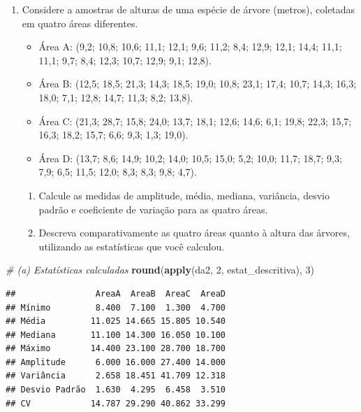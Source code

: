 \documentclass[]{article}
\newenvironment{Shaded}{\begin{snugshade}}{\end{snugshade}}
\newcommand{\KeywordTok}[1]{\textcolor[rgb]{0.13,0.29,0.53}{\textbf{#1}}}
\newcommand{\DecValTok}[1]{\textcolor[rgb]{0.00,0.00,0.81}{#1}}
\newcommand{\CommentTok}[1]{\textcolor[rgb]{0.56,0.35,0.01}{\textit{#1}}}
\newcommand{\NormalTok}[1]{#1}
\providecommand{\tightlist}{%
  \setlength{\itemsep}{0pt}\setlength{\parskip}{0pt}}
\begin{document}
\begin{enumerate}
\def\labelenumi{\arabic{enumi}.}
\setcounter{enumi}{1}
\tightlist
\item
  Considere a amostras de alturas de uma espécie de árvore (metros),
  coletadas em quatro áreas diferentes.

  \begin{itemize}
  \tightlist
  \item
    Área A: (9,2; 10,8; 10,6; 11,1; 12,1; 9,6; 11,2; 8,4; 12,9; 12,1;
    14,4; 11,1; 11,1; 9,7; 8,4; 12,3; 10,7; 12,9; 9,1; 12,8).
  \item
    Área B: (12,5; 18,5; 21,3; 14,3; 18,5; 19,0; 10,8; 23,1; 17,4; 10,7;
    14,3; 16,3; 18,0; 7,1; 12,8; 14,7; 11,3; 8,2; 13,8).
  \item
    Área C: (21,3; 28,7; 15,8; 24,0; 13,7; 18,1; 12,6; 14,6; 6,1; 19,8;
    22,3; 15,7; 16,3; 18,2; 15,7; 6,6; 9,3; 1,3; 19,0).
  \item
    Área D: (13,7; 8,6; 14,9; 10,2; 14,0; 10,5; 15,0; 5,2; 10,0; 11,7;
    18,7; 9,3; 7,9; 6,5; 11,5; 12,0; 8,3; 8,3; 9,8; 4,7).
  \end{itemize}

  \begin{enumerate}
  \def\labelenumii{(\alph{enumii})}
  \tightlist
  \item
    Calcule as medidas de amplitude, média, mediana, variância, desvio
    padrão e coeficiente de variação para as quatro áreas.
  \item
    Descreva comparativamente as quatro áreas quanto à altura das
    árvores, utilizando as estatísticas que você calculou.
  \end{enumerate}
\end{enumerate}

\begin{Shaded}
\begin{Highlighting}[]
\CommentTok{# (a) Estatísticas calculadas}
\KeywordTok{round}\NormalTok{(}\KeywordTok{apply}\NormalTok{(da2, }\DecValTok{2}\NormalTok{, estat_descritiva), }\DecValTok{3}\NormalTok{)}
\end{Highlighting}
\end{Shaded}

\begin{verbatim}
##                AreaA  AreaB  AreaC  AreaD
## Mínimo         8.400  7.100  1.300  4.700
## Média         11.025 14.665 15.805 10.540
## Mediana       11.100 14.300 16.050 10.100
## Máximo        14.400 23.100 28.700 18.700
## Amplitude      6.000 16.000 27.400 14.000
## Variância      2.658 18.451 41.709 12.318
## Desvio Padrão  1.630  4.295  6.458  3.510
## CV            14.787 29.290 40.862 33.299
\end{verbatim}
\end{document}
